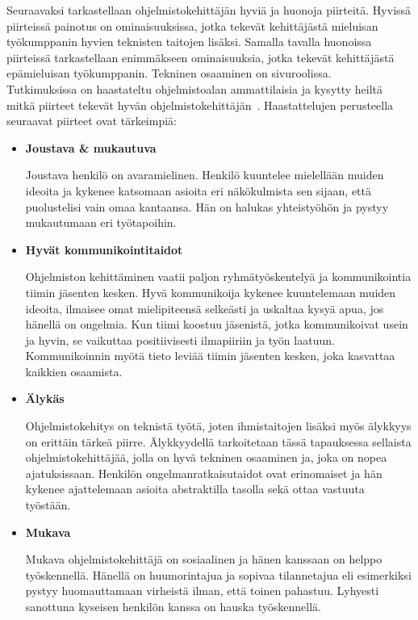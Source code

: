 \documentclass[finnish]{../tktltiki2}
\theoremstyle{definition}
\theoremstyle{remark}
\begin{document}
Seuraavaksi tarkastellaan ohjelmistokehittäjän hyviä ja huonoja
piirteitä. Hyvissä piirteissä painotus on ominaisuuksissa, jotka
tekevät kehittäjästä mieluisan työkumppanin hyvien teknisten
taitojen lisäksi. Samalla tavalla huonoissa piirteissä tarkastellaan
enimmäkseen ominaisuuksia, jotka tekevät kehittäjästä epämieluisan työkumppanin. Tekninen osaaminen on sivuroolissa.\\

Tutkimuksissa
on haastateltu ohjelmistoalan ammattilaisia ja kysytty heiltä mitkä
piirteet tekevät hyvän ohjelmistokehittäjän~\cite{Begel:2008:PPW:1414004.1414026,Hall:2007:CNT:1235000.1235043}. Haastattelujen perusteella seuraavat piirteet ovat tärkeimpiä:

\begin{itemize}

\item {\bf Joustava \& mukautuva}

Joustava henkilö on avaramielinen. Henkilö kuuntelee mielellään muiden
ideoita ja kykenee katsomaan asioita eri näkökulmista sen sijaan, että
puolustelisi vain omaa kantaansa. Hän on halukas yhteistyöhön
ja pystyy mukautumaan eri työtapoihin.

\item {\bf Hyvät kommunikointitaidot}

Ohjelmiston kehittäminen vaatii paljon ryhmätyöskentelyä ja
kommunikointia tiimin jäsenten kesken. Hyvä kommunikoija kykenee
kuuntelemaan muiden ideoita, ilmaisee omat mielipiteensä selkeästi ja uskaltaa
kysyä apua, jos hänellä on ongelmia. Kun tiimi koostuu jäsenistä,
jotka kommunikoivat usein ja hyvin, se vaikuttaa positiivisesti
ilmapiiriin ja työn laatuun. Kommunikoinnin myötä
tieto leviää tiimin jäsenten kesken, joka kasvattaa kaikkien osaamista.

\item {\bf Älykäs}

Ohjelmistokehitys on teknistä työtä, joten
ihmistaitojen lisäksi myös älykkyys on erittäin tärkeä piirre.
Älykkyydellä tarkoitetaan tässä tapauksessa sellaista ohjelmistokehittäjää, jolla on hyvä tekninen osaaminen ja, joka on nopea
ajatuksissaan. Henkilön ongelmanratkaisutaidot ovat erinomaiset
ja hän kykenee ajattelemaan asioita abstraktilla tasolla sekä ottaa
vastuuta työstään.

\item {\bf Mukava}

Mukava ohjelmistokehittäjä on sosiaalinen ja hänen kanssaan on
helppo työskennellä. Hänellä on huumorintajua ja sopivaa
tilannetajua eli esimerkiksi pystyy huomauttamaan virheistä ilman,
että toinen pahastuu. Lyhyesti sanottuna kyseisen henkilön kanssa
on hauska työskennellä.

\end{itemize}
\end{document}
